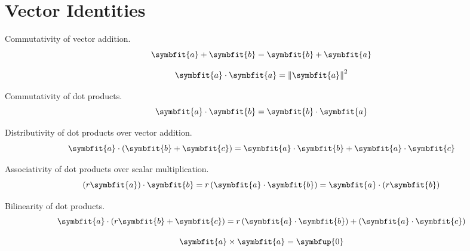 \documentclass{article}
\begin{document}
\section{Vector Identities}
\begin{theorem}
    Commutativity of vector addition.
    \begin{equation*}
        \symbfit{a} + \symbfit{b} = \symbfit{b} + \symbfit{a}
    \end{equation*}
\end{theorem}
\begin{theorem}
    \begin{equation*}
        \symbfit{a}\cdot\symbfit{a}=\norm{\symbfit{a}}^2
    \end{equation*}
\end{theorem}
\begin{theorem}
    Commutativity of dot products.
    \begin{equation*}
        \symbfit{a}\cdot \symbfit{b} = \symbfit{b}\cdot \symbfit{a}
    \end{equation*}
\end{theorem}
\begin{theorem}
    Distributivity of dot products over vector addition.
    \begin{equation*}
        \symbfit{a}\cdot \left(\symbfit{b}+\symbfit{c}\right) = \symbfit{a}\cdot\symbfit{b} + \symbfit{a}\cdot\symbfit{c}
    \end{equation*}
\end{theorem}
\begin{theorem}
    Associativity of dot products over scalar multiplication.
    \begin{equation*}
        \left(r\symbfit{a}\right)\cdot\symbfit{b} = r\left(\symbfit{a}\cdot\symbfit{b}\right)=\symbfit{a}\cdot\left(r\symbfit{b}\right)
    \end{equation*}
\end{theorem}
\begin{theorem}
    Bilinearity of dot products.
    \begin{equation*}
        \symbfit{a}\cdot\left(r\symbfit{b}+\symbfit{c}\right)=r\left(\symbfit{a}\cdot\symbfit{b}\right)+\left(\symbfit{a}\cdot\symbfit{c}\right)
    \end{equation*}
\end{theorem}
\begin{theorem}
    \begin{equation*}
        \symbfit{a}\times \symbfit{a} = \symbfup{0}
    \end{equation*}
\end{theorem}
\end{document}
